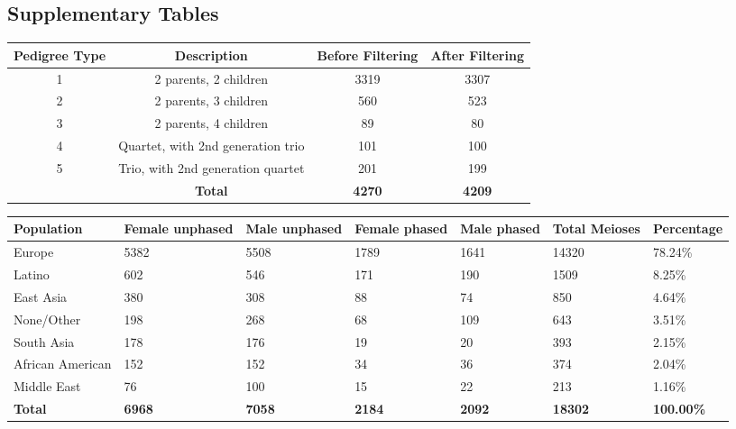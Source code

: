 \subsection{Supplementary Tables}


\begin{table}[!h] \centering
    \begin{tabular}{|c|c|c|c|} 
        \hline Pedigree Type & Description & Before Filtering & After Filtering \\ \hline
        1 & 2 parents, 2 children & 3319 & 3307 \\
        2 & 2 parents, 3 children & 560 & 523 \\
        3 & 2 parents, 4 children & 89 & 80 \\
        4 & Quartet, with 2nd generation trio & 101 & 100 \\
        5 & Trio, with 2nd generation quartet & 201 & 199 \\
        \hline & \textbf{Total} & \textbf{4270} & \textbf{4209} \\
    \hline \end{tabular}
\end{table}

\begin{table}[!h] \centering
    \begin{tabular}{|p{3cm}p{1.5cm}p{1.5cm}p{1.5cm}p{1.5cm}p{1.5cm}p{2cm}|}
        \hline 
    Population & Female \mbox{unphased} & Male \mbox{unphased} & Female phased & Male phased & Total Meioses & Percentage \\ \hline
    Europe & 5382 & 5508 & 1789 & 1641 & 14320 & 78.24\% \\
    Latino & 602 & 546 & 171 & 190 & 1509 & 8.25\% \\
    East Asia & 380 & 308 & 88 & 74 & 850 & 4.64\% \\
    None/Other & 198 & 268 & 68 & 109 & 643 & 3.51\% \\
    South Asia & 178 & 176 & 19 & 20 & 393 & 2.15\% \\
    African American & 152 & 152 & 34 & 36 & 374 & 2.04\% \\
    Middle East & 76 & 100 & 15 & 22 & 213 & 1.16\% \\
    \hline \textbf{Total} & \textbf{6968} & \textbf{7058} & \textbf{2184} & \textbf{2092} & \textbf{18302} & \textbf{100.00\%} \\
    \hline \end{tabular}
     {
    \label{tab:cointTS2}}
\end{table}


